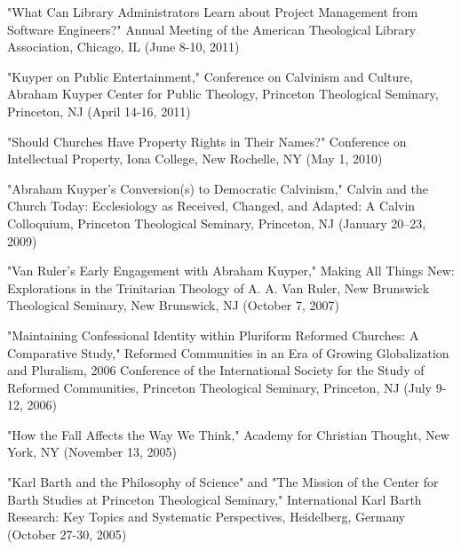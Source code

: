 \documentclass[]{res} %
\begin{document}
\begin{resume}
\begin{hangparas}{.25in}{1}"What Can Library Administrators Learn about Project Management from Software Engineers?" Annual Meeting of the American Theological Library Association, Chicago, IL (June 8-10, 2011)\end{hangparas}

\begin{hangparas}{.25in}{1}"Kuyper on Public Entertainment," Conference on Calvinism and Culture, Abraham Kuyper Center for Public Theology, Princeton Theological Seminary, Princeton, NJ (April 14-16, 2011)\end{hangparas}

\begin{hangparas}{.25in}{1}"Should Churches Have Property Rights in Their Names?" Conference on Intellectual Property, Iona College, New Rochelle, NY (May 1, 2010)\end{hangparas}

\begin{hangparas}{.25in}{1}"Abraham Kuyper’s Conversion(s) to Democratic Calvinism," Calvin and the Church Today: Ecclesiology as Received, Changed, and Adapted: A Calvin Colloquium, Princeton Theological Seminary, Princeton, NJ (January 20–23, 2009)\end{hangparas}

\begin{hangparas}{.25in}{1}"Van Ruler’s Early Engagement with Abraham Kuyper," Making All Things New: Explorations in the Trinitarian Theology of A. A. Van Ruler, New Brunswick Theological Seminary, New Brunswick, NJ (October 7, 2007)\end{hangparas}

\begin{hangparas}{.25in}{1}"Maintaining Confessional Identity within Pluriform Reformed Churches: A Comparative Study," Reformed Communities in an Era of Growing Globalization and Pluralism, 2006 Conference of the International Society for the Study of Reformed Communities, Princeton Theological Seminary, Princeton, NJ (July 9-12, 2006)\end{hangparas}

\begin{hangparas}{.25in}{1}"How the Fall Affects the Way We Think," Academy for Christian Thought, New York, NY (November 13, 2005)\end{hangparas}

\begin{hangparas}{.25in}{1}"Karl Barth and the Philosophy of Science" and "The Mission of the Center for Barth Studies at Princeton Theological Seminary," International Karl Barth Research: Key Topics and Systematic Perspectives, Heidelberg, Germany (October 27-30, 2005)\end{hangparas}


\end{resume}
\end{document}
